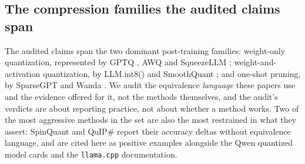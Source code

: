 \subsection{The compression families the audited claims span}
\label{app:related:families}

The audited claims span the two dominant post-training families: weight-only
quantization, represented by GPTQ \citep{gptq2022}, AWQ \citep{awq2023} and
SqueezeLLM \citep{squeezellm2023}; weight-and-activation quantization, by
LLM.int8() \citep{llmint82022} and SmoothQuant \citep{smoothquant2022}; and
one-shot pruning, by SparseGPT \citep{sparsegpt2023} and Wanda
\citep{wanda2023}. We audit the equivalence \emph{language} these papers use
and the evidence offered for it, not the methods themselves, and the audit's
verdicts are about reporting practice, not about whether a method works.
Two of the most aggressive methods in the set are also the most restrained in
what they assert: SpinQuant \citep{spinquant2024} and QuIP\#
\citep{quipsharp2024} report their accuracy deltas without equivalence
language, and are cited here as positive examples alongside the Qwen quantized
model cards and the \texttt{llama.cpp} documentation.

